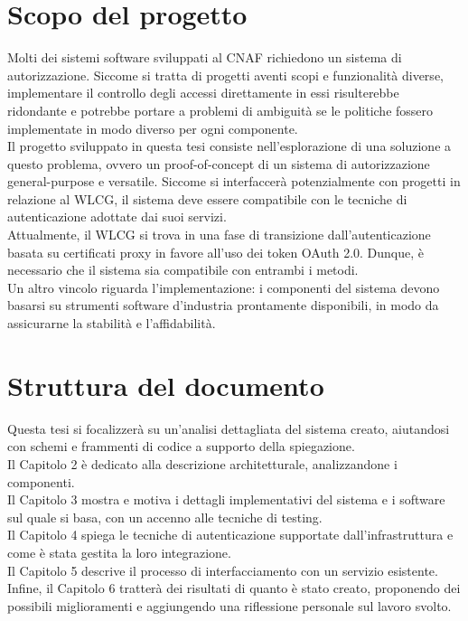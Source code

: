 \section{Scopo del progetto}
Molti dei sistemi software sviluppati al CNAF richiedono un sistema di autorizzazione. Siccome si tratta di progetti aventi scopi e funzionalità diverse,
implementare 
il controllo degli accessi direttamente in essi risulterebbe ridondante e potrebbe portare a problemi di ambiguità 
se le politiche fossero implementate in modo diverso per ogni componente.
\\ Il progetto sviluppato in questa tesi consiste nell'esplorazione di una soluzione a questo problema, ovvero un proof-of-concept di 
un sistema di autorizzazione general-purpose e versatile. Siccome si interfaccerà potenzialmente con progetti in relazione al WLCG, 
il sistema deve essere compatibile
 con le tecniche di autenticazione adottate dai suoi servizi.
\\ Attualmente, il WLCG si trova in una fase di transizione dall'autenticazione basata su certificati proxy in favore all'uso dei token OAuth 2.0.
 Dunque, è necessario che il sistema sia compatibile con entrambi i metodi. 
\\Un altro vincolo riguarda l'implementazione: i componenti del sistema devono basarsi su strumenti software d'industria prontamente disponibili,
 in modo da assicurarne 
la stabilità e l'affidabilità.  

\section{Struttura del documento}
Questa tesi si focalizzerà su un'analisi dettagliata del sistema creato, aiutandosi con schemi e frammenti 
di codice a supporto della spiegazione.
\\ Il Capitolo 2 è dedicato alla descrizione architetturale, analizzandone i componenti. 
\\ Il Capitolo 3 mostra e motiva i dettagli implementativi del sistema e i software sul quale si basa, con un accenno alle tecniche di testing. 
\\ Il Capitolo 4 spiega le tecniche di autenticazione supportate dall'infrastruttura e come è stata gestita la loro integrazione.  
\\ Il Capitolo 5 descrive il processo di interfacciamento con un servizio esistente. 
\\ Infine, il Capitolo 6 tratterà dei risultati di quanto è stato creato, proponendo 
dei possibili miglioramenti e aggiungendo una riflessione personale sul lavoro svolto. 
